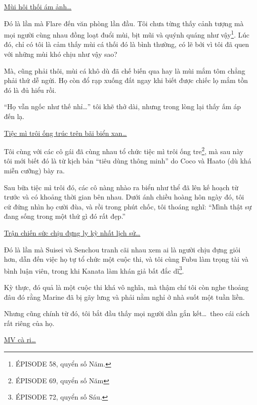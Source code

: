 \documentclass[../main.tex]{subfiles}
\begin{document}
\begin{center}
    \uline{Mùi hôi thối ám ảnh\dots}
\end{center}

Đó là lần mà Flare đến văn phòng lần đầu. Tôi chưa từng thấy cảnh tượng mà mọi người cùng nhau đồng loạt đuổi mùi, bịt mũi và quýnh quáng như vậy\footnote{{\flaregothic ÉPISODE 58}, quyển số Năm.}. Lúc đó, chỉ có tôi là cảm thấy mùi cá thối đó là bình thường, có lẽ bởi vì tôi đã quen với những mùi khó chịu như vậy sao?

Mà, cũng phải thôi, mùi cá khô dù đã chế biến qua hay là mùi mắm tôm chẳng phải thứ dễ ngửi. Họ còn đổ rạp xuống đất ngay khi biết được chiếc lọ mắm tồn đó là đủ hiểu rồi.

``Họ vẫn ngốc như thế nhỉ\dots'' tôi khẽ thở dài, nhưng trong lòng lại thấy ấm áp đến lạ.

\begin{center}
    \uline{Tiệc mì trôi ống trúc trên bãi biển xan\dots}
\end{center}

Tôi cùng với các cô gái đã cùng nhau tổ chức tiệc mì trôi ống tre\footnote{{\flaregothic ÉPISODE 69}, quyển số Năm}, mà sau này tôi mới biết đó là từ kịch bản ``tiêu dùng thông minh'' do Coco và Haato (dù khá miễn cưỡng) bày ra.

Sau bữa tiệc mì trôi đó, các cô nàng nhào ra biển như thể đã lên kế hoạch từ trước và có khoảng thời gian bên nhau. Dưới ánh chiều hoàng hôn ngày đó, tôi cứ đứng nhìn họ cười đùa, và rồi trong phút chốc, tôi thoáng nghĩ: ``Mình thật sự đang sống trong một thứ gì đó rất đẹp.''

\begin{center}
    \uline{Trận chiến sức chịu đựng ly kỳ nhất lịch sử\dots}
\end{center}

Đó là lần mà Suisei và Senchou tranh cãi nhau xem ai là người chịu đựng giỏi hơn, dẫn đến việc họ tự tổ chức một cuộc thi, và tôi cùng Fubu làm trọng tài và bình luận viên, trong khi Kanata làm khán giả bất đắc dĩ\footnote{{\flaregothic ÉPISODE 72}, quyển số Sáu.}.

Kỳ thực, đó quả là một cuộc thi khá vô nghĩa, mà thậm chí tôi còn nghe thoảng đâu đó rằng Marine đã bị gãy lưng và phải nằm nghỉ ở nhà suốt một tuần liền.

Nhưng cũng chính từ đó, tôi bắt đầu thấy mọi người dần gắn kết\dots\ theo cái cách rất riêng của họ.

\begin{center}
    \uline{MV cà ri\dots}
\end{center}
\end{document}
